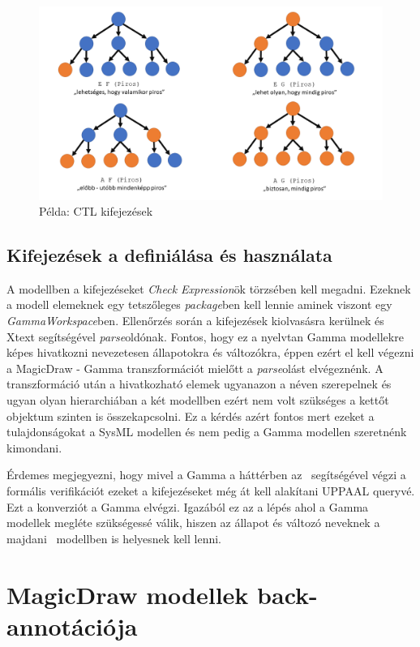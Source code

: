 \begin{figure}[!ht]
	\centering
	\includegraphics[width=140mm, keepaspectratio]{figures/contribution/CTL.png}
	\caption{Példa: CTL kifejezések}
	\label{fig:ctl}
\end{figure}

\subsection{Kifejezések a definiálása és használata}
A modellben a kifejezéseket \emph{Check Expression}ök törzsében kell megadni. Ezeknek a modell elemeknek egy tetszőleges \emph{package}ben kell lennie aminek viszont egy \emph{GammaWorkspace}ben. Ellenőrzés során a kifejezések kiolvasásra kerülnek és Xtext segítségével \emph{parse}oldónak. Fontos, hogy ez a nyelvtan Gamma modellekre képes hivatkozni nevezetesen állapotokra és változókra, éppen ezért el kell végezni a MagicDraw - Gamma transzformációt mielőtt a \emph{parse}olást elvégeznénk. A transzformáció után a hivatkozható elemek ugyanazon a néven szerepelnek és ugyan olyan hierarchiában a két modellben ezért nem volt szükséges a kettőt objektum szinten is összekapcsolni. Ez  a kérdés azért fontos mert ezeket a tulajdonságokat a SysML modellen és nem pedig a Gamma modellen szeretnénk kimondani.

Érdemes megjegyezni, hogy mivel a Gamma a háttérben az \uppaal\ segítségével végzi a formális verifikációt ezeket a kifejezéseket még át kell alakítani UPPAAL queryvé. Ezt a konverziót a Gamma elvégzi. Igazából ez az a lépés ahol a Gamma modellek megléte szükségessé válik, hiszen az állapot és változó neveknek a majdani \uppaal\ modellben is helyesnek kell lenni.


\section{MagicDraw modellek back-annotációja}

